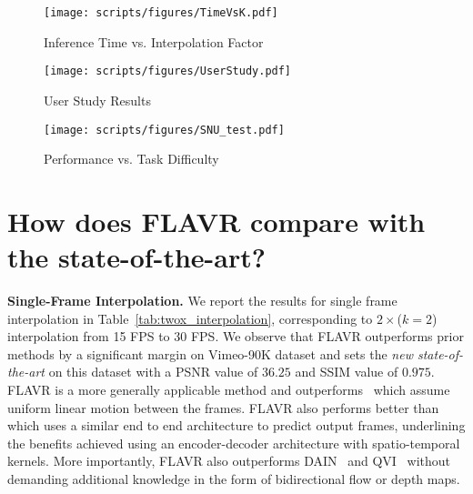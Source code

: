 \documentclass[10pt,twocolumn,letterpaper]{article}
\newcommand{\tabref}[1]{Table~\ref{#1}}
\newcommand{\Ours}{FLAVR}
\newcommand{\twox}{$2\times$}
\begin{document}
\begin{figure*}
     \centering
     \begin{subfigure}[t]{0.32\textwidth}
        \centering
        \texttt{[image: scripts/figures/TimeVsK.pdf]}
        \caption{Inference Time vs. Interpolation Factor}
        \label{fig:TimeVsK}
     \end{subfigure}
     \hfill
     \begin{subfigure}[t]{0.32\textwidth}
        \centering
        \texttt{[image: scripts/figures/UserStudy.pdf]}
        \caption{User Study Results}
        \label{fig:userStudy}
     \end{subfigure}
     \hfill
     \begin{subfigure}[t]{0.32\textwidth}
        \centering
        \texttt{[image: scripts/figures/SNU\_test.pdf]}
        \captionsetup{width=\textwidth}
        \caption{Performance vs. Task Difficulty}
        \label{fig:SNUTest}
     \end{subfigure}
\vspace{-2pt}
\caption{{\bf Analysis}. (a) Inference time (forward pass w/o IO) of different methods on different interpolation factor. \Ours{} has almost no change in inference time due to its design to predict multiple frames per inference. (b) Comparison between \Ours{} with Super-SloMo and QVI in a user study on DAVIS. \Ours{} significantly outperforms Super-SloMo, and performs comparable to QVI. (c) Comparison between \Ours{} with other methods on SNU-Film dataset. \Ours{} consistently outperforms all comparing methods across all levels of task difficulty.}
\vspace{-12pt}
\label{fig:analysis}
\end{figure*} 

\section{How does \Ours{} compare with the state-of-the-art?}
\label{sec:state-of-the-art}

{\bf Single-Frame Interpolation.} We report the results for single frame interpolation in \tabref{tab:twox_interpolation}, corresponding to \twox{}($k{=}2$) interpolation from 15 FPS to 30 FPS. We observe that \Ours{} outperforms prior methods by a significant margin on Vimeo-90K dataset and sets the \textit{new state-of-the-art} on this dataset with a PSNR value of 
$36.25$ and SSIM value of $0.975$. \Ours{} is a more generally applicable method and outperforms~\cite{jiang2018super, liu2017video, niklaus2017video} which assume uniform linear motion between the frames. 
\Ours{} also performs better than~\cite{choi2020channel} which uses a similar end to end architecture to predict output frames, underlining the benefits achieved using an encoder-decoder architecture with spatio-temporal kernels. More importantly, \Ours{} also outperforms DAIN~\cite{bao2019depth} and QVI~\cite{xu2019quadratic} without demanding additional knowledge in the form of bidirectional flow or depth maps.
\end{document}
